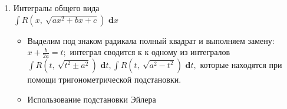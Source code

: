 \documentclass[a4paper,12pt, centered]{bookest}
\theoremstyle{remark}
\newcommand\dx{\textbf{ d}x}
\newcommand\dy{\textbf{ d}}
\begin{document}
\begin{enumerate}
\begin{enumerate}
\begin{example}
	\end{example}
	\begin{example}
		$\int\frac{x+4}{\sqrt{6-2x-x^2}}\dx=\left|\begin{array}{l}
			6-2x-x^2=-((x^2+2x+1)-7)=-(x+1)^2+7=\\=7-(x+1)^2=(\sqrt7)^2-(x+1)^2
		\end{array}\right|=\\=|x+1=t|=\int\frac{t+3}{\sqrt{(\sqrt7)^2+(t^2)}}\dy t=\int\frac{t\dy t}{\sqrt{7-t^2}}+3\int\frac{\dy t}{\sqrt{7-t^2}}=-\frac12\int\frac{\dy(7-t^2)}{\sqrt{7-t^2}}+\\+3\arcsin\frac t{\sqrt{7}}=-\sqrt{7-t^2}+3\arcsin\frac t{\sqrt7}+c=-\sqrt{6-2x-x^2}+\\+3\arcsin\frac{x+1}{\sqrt7}+c$
	\end{example}
	\begin{example}
		$\int\frac{x^2\dx}{\sqrt{1-2x-x^2}}=(Ax+B)\sqrt{1-2x-x^2}+\lambda\left.\int\frac{\dx}{\sqrt{1-2x-x^2}}\right|'=\frac{x^2}{\sqrt{1-2x-x^2}}=\\=A\sqrt{1-2x-x^2}+(Ax+B)\cdot\frac{-2-2}{2\sqrt{1-2x-x^2}}+\left.\frac{\lambda}{\sqrt{1-2x-x^2}}\right|\cdot\sqrt{1-2x-x^2}\\x^2=A-2Ax-Ax^2-Ax^2-Ax-Bx-B+\lambda\\\begin{cases}
			-2A=1\\-3A+B=0\\A-B+\lambda=0
		\end{cases}\begin{cases}
			A=-\frac12\\B=\frac32\lambda=2
		\end{cases}\\\underbrace{\left(-\frac12x+\frac32\right)\sqrt{1-2x-x^2}}_{F(x)}+2\int\frac{\dx}{\sqrt{2-(x+1)^2}}=F(x)+2\arcsin\frac{x+1}{\sqrt2}+c$
	\end{example}
	\end{enumerate}
	\item Интегралы общего вида \\ $\int R(x,\>\sqrt{ax^2+bx+c})\dx$
		\begin{itemize}
			\item [Способ 1] Выделим под знаком радикала полный квадрат и выполняем замену: $x+\frac b{2a}=t;$ интеграл сводится к к одному из интегралов \\$\int R(t,\>\sqrt{t^2\pm a^2})\dy t,\int R(t,\>\sqrt{a^2-t^2})\dy t,$ которые находятся при помощи тригонометрической подстановки.\newpage
			\item [Способ 2] Использование подстановки Эйлера 

\end{itemize}
\end{enumerate}
\end{document}
